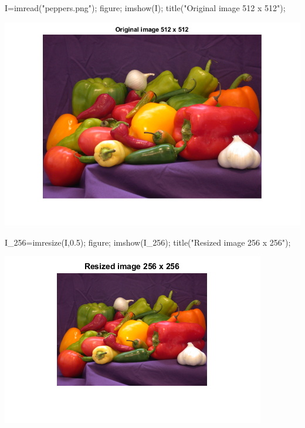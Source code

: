 \documentclass[12pt, onecolumn]{IEEEtran}
\begin{document}
\vspace{1em}



\vspace{1em}
\begin{matlabcode}
I=imread("peppers.png"); %
figure; imshow(I); title("Original image 512 x 512");
\end{matlabcode}
\begin{center}
\includegraphics[width=\maxwidth{69.44305067737079em}]{figure_7.png}
\end{center}
\begin{matlabcode}

I_256=imresize(I,0.5); %
figure; imshow(I_256); title("Resized image 256 x 256");
\end{matlabcode}
\begin{center}
\includegraphics[width=\maxwidth{43.753135975915704em}]{figure_8.png}
\end{center}
\end{document}
